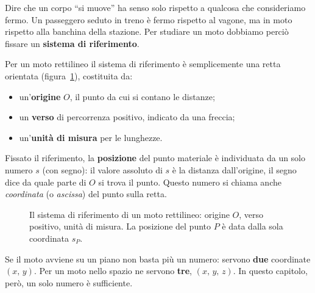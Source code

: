 Dire che un corpo ``si muove'' ha senso solo rispetto a qualcosa che consideriamo fermo. Un passeggero seduto in treno è fermo rispetto al vagone, ma in moto rispetto alla banchina della stazione. Per studiare un moto dobbiamo perciò fissare un \textbf{sistema di riferimento}.

Per un moto rettilineo il sistema di riferimento è semplicemente una retta orientata (figura~\ref{fig:sr-rettilineo}), costituita da:
\begin{itemize}
    \item un'\textbf{origine} $O$, il punto da cui si contano le distanze;
    \item un \textbf{verso} di percorrenza positivo, indicato da una freccia;
    \item un'\textbf{unità di misura} per le lunghezze.
\end{itemize}
Fissato il riferimento, la \textbf{posizione} del punto materiale è individuata da un solo numero $s$ (con segno): il valore assoluto di $s$ è la distanza dall'origine, il segno dice da quale parte di $O$ si trova il punto. Questo numero si chiama anche \emph{coordinata} (o \emph{ascissa}) del punto sulla retta.

\begin{figure}[!htbp]
    \centering
    \caption{Il sistema di riferimento di un moto rettilineo: origine $O$, verso positivo, unità di misura. La posizione del punto $P$ è data dalla sola coordinata $s_P$.}
    \label{fig:sr-rettilineo}
\end{figure}

Se il moto avviene su un piano non basta più un numero: servono \textbf{due} coordinate $(x,\,y)$. Per un moto nello spazio ne servono \textbf{tre}, $(x,\,y,\,z)$. In questo capitolo, però, un solo numero è sufficiente.

